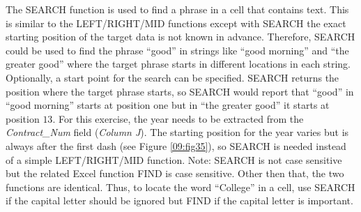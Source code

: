 The SEARCH function is used to find a phrase in a cell that contains text. This is similar to the LEFT/RIGHT/MID functions except with SEARCH the exact starting position of the target data is not known in advance. Therefore, SEARCH could be used to find the phrase ``good'' in strings like ``good morning'' and ``the greater good'' where the target phrase starts in different locations in each string. Optionally, a start point for the search can be specified. SEARCH returns the position where the target phrase starts, so SEARCH would report that ``good'' in ``good morning'' starts at position one but in ``the greater good'' it starts at position $ 13 $. For this exercise, the year needs to be extracted from the \textit{Contract\_Num} field (\textit{Column J}). The starting position for the year varies but is always after the first dash (see Figure \ref{09:fig35}), so SEARCH is needed instead of a simple LEFT/RIGHT/MID function. Note: SEARCH is not case sensitive but the related Excel function FIND is case sensitive. Other then that, the two functions are identical. Thus, to locate the word ``College'' in a cell, use SEARCH if the capital letter should be ignored but FIND if the capital letter is important.

